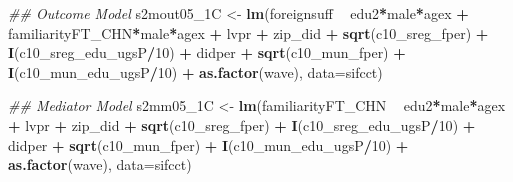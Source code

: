 \documentclass[
]{article}
\newenvironment{Shaded}{\begin{snugshade}}{\end{snugshade}}
\newcommand{\CommentTok}[1]{\textcolor[rgb]{0.56,0.35,0.01}{\textit{#1}}}
\newcommand{\DataTypeTok}[1]{\textcolor[rgb]{0.13,0.29,0.53}{#1}}
\newcommand{\DecValTok}[1]{\textcolor[rgb]{0.00,0.00,0.81}{#1}}
\newcommand{\KeywordTok}[1]{\textcolor[rgb]{0.13,0.29,0.53}{\textbf{#1}}}
\newcommand{\NormalTok}[1]{#1}
\newcommand{\OperatorTok}[1]{\textcolor[rgb]{0.81,0.36,0.00}{\textbf{#1}}}
\newcommand{\StringTok}[1]{\textcolor[rgb]{0.31,0.60,0.02}{#1}}
\begin{document}
\begin{Shaded}
\begin{Highlighting}[]
\CommentTok{## Outcome Model }
\NormalTok{s2mout05_1C <-}\StringTok{ }\KeywordTok{lm}\NormalTok{(foreignsuff  }\OperatorTok{~}\StringTok{ }\NormalTok{edu2}\OperatorTok{*}\NormalTok{male}\OperatorTok{*}\NormalTok{agex }\OperatorTok{+}\StringTok{ }\NormalTok{familiarityFT_CHN}\OperatorTok{*}\NormalTok{male}\OperatorTok{*}\NormalTok{agex }\OperatorTok{+}\StringTok{ }\NormalTok{lvpr }\OperatorTok{+}\StringTok{  }
\StringTok{                    }\NormalTok{zip_did }\OperatorTok{+}\StringTok{ }\KeywordTok{sqrt}\NormalTok{(c10_sreg_fper) }\OperatorTok{+}\StringTok{ }\KeywordTok{I}\NormalTok{(c10_sreg_edu_ugsP}\OperatorTok{/}\DecValTok{10}\NormalTok{) }\OperatorTok{+}\StringTok{ }
\StringTok{                    }\NormalTok{didper }\OperatorTok{+}\StringTok{ }\KeywordTok{sqrt}\NormalTok{(c10_mun_fper) }\OperatorTok{+}\StringTok{ }\KeywordTok{I}\NormalTok{(c10_mun_edu_ugsP}\OperatorTok{/}\DecValTok{10}\NormalTok{) }\OperatorTok{+}\StringTok{ }
\StringTok{                    }\KeywordTok{as.factor}\NormalTok{(wave), }\DataTypeTok{data=}\NormalTok{sifcct)}

\CommentTok{## Mediator Model}
\NormalTok{s2mm05_1C <-}\StringTok{ }\KeywordTok{lm}\NormalTok{(familiarityFT_CHN  }\OperatorTok{~}\StringTok{ }\NormalTok{edu2}\OperatorTok{*}\NormalTok{male}\OperatorTok{*}\NormalTok{agex }\OperatorTok{+}\StringTok{ }\NormalTok{lvpr }\OperatorTok{+}\StringTok{  }
\StringTok{                  }\NormalTok{zip_did }\OperatorTok{+}\StringTok{ }\KeywordTok{sqrt}\NormalTok{(c10_sreg_fper) }\OperatorTok{+}\StringTok{ }\KeywordTok{I}\NormalTok{(c10_sreg_edu_ugsP}\OperatorTok{/}\DecValTok{10}\NormalTok{) }\OperatorTok{+}\StringTok{ }
\StringTok{                  }\NormalTok{didper }\OperatorTok{+}\StringTok{ }\KeywordTok{sqrt}\NormalTok{(c10_mun_fper) }\OperatorTok{+}\StringTok{ }\KeywordTok{I}\NormalTok{(c10_mun_edu_ugsP}\OperatorTok{/}\DecValTok{10}\NormalTok{) }\OperatorTok{+}\StringTok{ }
\StringTok{                  }\KeywordTok{as.factor}\NormalTok{(wave), }\DataTypeTok{data=}\NormalTok{sifcct)}


\end{Highlighting}
\end{Shaded}
\end{document}
